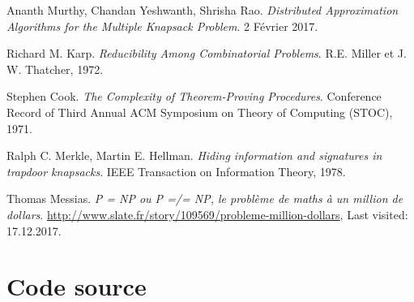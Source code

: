 \documentclass[12pt,a4paper]{article}
\begin{document}
\begin{thebibliography}{20}

Ananth Murthy, Chandan Yeshwanth, Shrisha Rao.									%
\textit{Distributed Approximation Algorithms for the Multiple Knapsack Problem}.	%
2 Février 2017.										%

Richard M. Karp.									%
\textit{Reducibility Among Combinatorial Problems}.	%
R.E. Miller et J. W. Thatcher, 1972.										%

Stephen Cook.									%
\textit{The Complexity of Theorem-Proving Procedures}.	%
Conference Record of Third Annual ACM Symposium on Theory of Computing (STOC), 1971.										%

Ralph C. Merkle, Martin E. Hellman.									%
\textit{Hiding information and signatures in trapdoor knapsacks}.	%
IEEE Transaction on Information Theory, 1978.

Thomas Messias.								%
\textit{P = NP ou P =/= NP, le problème de maths à un million de dollars}.					    %
\url{http://www.slate.fr/story/109569/probleme-million-dollars},			%
Last visited: 17.12.2017.									%
\end{thebibliography}




\appendix 
\renewcommand{\thesubsection}{\Alph{section}.\arabic{subsection}}

\clearpage	

\section{Code source} \label{app:sourceCode}
\end{document}
